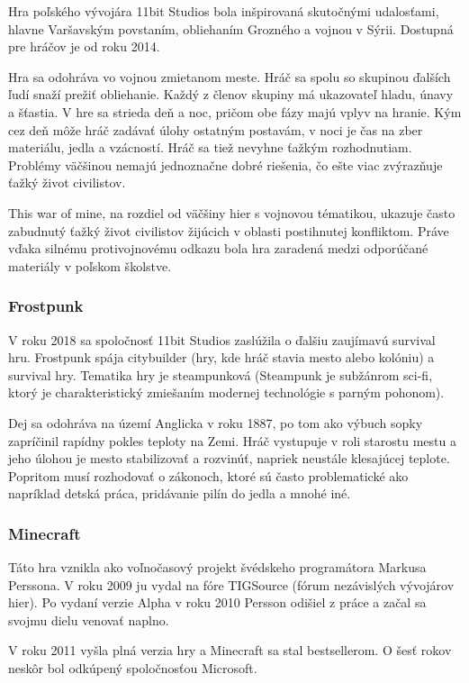 \documentclass[10pt,oneoside,slovak,a4paper]{article}
\begin{document}
Hra poľského vývojára 11bit Studios bola inšpirovaná skutočnými udalosťami, hlavne Varšavským povstaním, obliehaním Grozného a vojnou v Sýrii. Dostupná pre hráčov je od roku 2014.\cite{PL}

Hra sa odohráva vo  vojnou zmietanom meste. Hráč sa spolu so skupinou ďalších ľudí snaží prežiť obliehanie. Každý z členov skupiny má ukazovateľ hladu, únavy a šťastia. V hre sa strieda deň a noc, pričom obe fázy majú vplyv na hranie. Kým cez deň môže hráč zadávať úlohy ostatným  postavám, v noci je čas na zber materiálu, jedla a vzácností.
Hráč sa tiež nevyhne ťažkým rozhodnutiam. Problémy väčšinou nemajú jednoznačne dobré riešenia, čo ešte viac zvýrazňuje ťažký život civilistov.\cite{Pergerson}

This war of mine, na rozdiel od väčšiny hier s vojnovou tématikou, ukazuje často zabudnutý ťažký život civilistov žijúcich v oblasti postihnutej konfliktom. Práve vďaka silnému protivojnovému odkazu bola hra zaradená  medzi odporúčané materiály v poľskom školstve. \cite{PL}

\subsubsection{Frostpunk}

V roku 2018 sa spoločnosť 11bit Studios zaslúžila o ďalšiu zaujímavú survival hru. Frostpunk spája citybuilder (hry, kde hráč stavia mesto alebo kolóniu) a survival hry. Tematika hry je steampunková (Steampunk je subžánrom sci-fi, ktorý je charakteristický zmiešaním modernej technológie s parným pohonom).\cite{Salo}

Dej sa odohráva na území Anglicka v roku 1887, po tom ako výbuch sopky zapríčinil rapídny pokles teploty na Zemi.
Hráč vystupuje v roli starostu mestu a jeho úlohou je mesto stabilizovať a rozvinúť, napriek neustále klesajúcej teplote. Popritom  musí rozhodovať o zákonoch, ktoré sú často problematické ako napríklad detská práca, pridávanie pilín do jedla a mnohé iné.\cite{Salo}\cite{FW}


\subsubsection{Minecraft}
Táto hra vznikla ako voľnočasový projekt švédskeho programátora Markusa Perssona. V roku 2009 ju vydal na fóre TIGSource (fórum nezávislých vývojárov hier). Po vydaní verzie Alpha v roku 2010 Persson odišiel z práce a začal sa svojmu dielu venovať naplno.\cite{RB}

V roku 2011 vyšla plná verzia hry a Minecraft sa stal bestsellerom. O šesť rokov neskôr bol odkúpený spoločnosťou Microsoft.\cite{RB}
\end{document}
